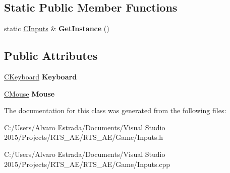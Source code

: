 \subsection*{Static Public Member Functions}
\begin{DoxyCompactItemize}
\item 
static \hyperlink{class_c_inputs}{C\+Inputs} \& {\bfseries Get\+Instance} ()\hypertarget{class_c_inputs_aad29853d2a9fa828881c2d51c3880308}{}\label{class_c_inputs_aad29853d2a9fa828881c2d51c3880308}

\end{DoxyCompactItemize}
\subsection*{Public Attributes}
\begin{DoxyCompactItemize}
\item 
\hyperlink{class_c_keyboard}{C\+Keyboard} {\bfseries Keyboard}\hypertarget{class_c_inputs_a50065994f9ba9e6983f7e20d3ac1abbb}{}\label{class_c_inputs_a50065994f9ba9e6983f7e20d3ac1abbb}

\item 
\hyperlink{class_c_mouse}{C\+Mouse} {\bfseries Mouse}\hypertarget{class_c_inputs_a74bb140c4167f85b64c934e1aced3f1d}{}\label{class_c_inputs_a74bb140c4167f85b64c934e1aced3f1d}

\end{DoxyCompactItemize}


The documentation for this class was generated from the following files\+:\begin{DoxyCompactItemize}
\item 
C\+:/\+Users/\+Alvaro Estrada/\+Documents/\+Visual Studio 2015/\+Projects/\+R\+T\+S\+\_\+\+A\+E/\+R\+T\+S\+\_\+\+A\+E/\+Game/Inputs.\+h\item 
C\+:/\+Users/\+Alvaro Estrada/\+Documents/\+Visual Studio 2015/\+Projects/\+R\+T\+S\+\_\+\+A\+E/\+R\+T\+S\+\_\+\+A\+E/\+Game/Inputs.\+cpp\end{DoxyCompactItemize}
